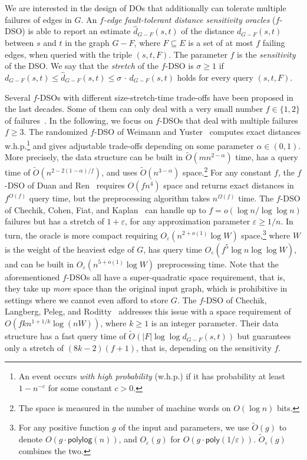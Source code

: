 \documentclass{article}\usepackage[a4paper,margin=20mm]{geometry}
\newcommand*{\Otilde}{\widetilde{O}}
\newcommand*{\poly}{\textsf{poly}}
\newcommand*{\polylog}{\textsf{polylog}}
\renewcommand{\leq}{\leqslant}
\renewcommand{\geq}{\geqslant}
\renewcommand{\ge}{\geqslant}
\newcommand{\eps}{\varepsilon}
\begin{document}
We are interested in the design of DOs that additionally can tolerate multiple failures of edges in $G$. 
An \emph{$f$-edge fault-tolerant distance sensitivity oracles} ($f$-DSO) is able to report an estimate $\widehat{d}_{G-F}(s,t)$ of the distance $d_{G-F}(s,t)$ between $s$ and $t$ in the graph $G-F$, where $F \subseteq E$ is a set of at most $f$ failing edges, when queried with the triple $(s,t,F)$. 
The parameter $f$ is the \emph{sensitivity} of the DSO.
We say that the \emph{stretch} of the $f$-DSO is $\sigma \geq 1$ if $d_{G-F}(s,t) \leq \widehat{d}_{G-F}(s,t) \leq \sigma \,{\cdot}\, d_{G-F}(s,t)$ holds for every query $(s,t,F)$. 

Several $f$-DSOs with different size-stretch-time trade-offs have been proposed in the last decades.
Some of them can only deal with a very small number $f \in \{1,2\}$ of failures~\cite{BaswanaK13, BeKa08, BeKa09, BCFS21SingleSourceDSO_ESA, ChCo20, DemetrescuT02, DeThChRa08, DuanP09a, GrandoniVWilliamsFasterRPandDSO_journal, GuRen21, Ren22Improved}. In the following, we focus on $f$-DSOs that deal with multiple failures $f \geq 3$. The randomized $f$-DSO of Weimann and Yuster~\cite{WY13} computes exact distances w.h.p.\footnote{%
  An event occurs \emph{with high probability} (w.h.p.) if it has probability at least $1- n^{-c}$ for some constant $c >0$.
}
and gives adjustable trade-offs depending on some parameter $\alpha \in (0,1)$.
More precisely, the data structure can be built in $\Otilde(mn^{2-\alpha})$ time, has a query time of 
$\Otilde(n^{2-2(1-\alpha)/f})$, and uses $\Otilde(n^{3-\alpha})$ space.\footnote{%
  The space is measured in the number of machine words on $O(\log n)$ bits.
} 
For any constant $f$, the $f$-DSO of Duan and Ren~\cite{DuRe22} requires $O(fn^4)$ space and
returns exact distances in $f^{O(f)}$ query time, but the preprocessing algorithm 
takes $n^{\Omega(f)}$ time. The $f$-DSO of Chechik, Cohen, Fiat, and Kaplan~\cite{ChCoFiKa17}
can handle up to $f = o(\log n / \log \log n)$ failures
but has a stretch of $1+\eps$, for any approximation parameter $\eps \ge 1/n$.
In turn, the oracle is more compact requiring $O_{\varepsilon}(n^{2+o(1)}\log W)$ space,\footnote{%
	For any positive function $g$ of the input and parameters, we use 
	$\Otilde(g)$ to denote $O(g \cdot \polylog(n))$,
	and $O_{\varepsilon}(g)$ for $O(g \cdot \poly(1/\varepsilon))$.
	$\Otilde_{\varepsilon}(g)$ combines the two.
}
where $W$ is the weight of the heaviest edge of $G$,
has query time $O_{\varepsilon}(f^5\log n \log \log W)$,
and can be built in $O_{\varepsilon}(n^{5+o(1)}\log W)$ preprocessing time.
Note that the aforementioned $f$-DSOs all have a super-quadratic space requirement,
that is, they take up \emph{more} space than the original input graph,
which is prohibitive in settings where we cannot even afford to store $G$.
The $f$-DSO of Chechik, Langberg, Peleg, and Roditty~\cite{CLPR12} addresses this issue
with a space requirement of $O(fkn^{1+1/k}\log(nW))$, 
where $k\geq 1$ is an integer parameter.
Their data structure has a fast query time of $\Otilde(|F| \log\log d_{G-F}(s,t))$
but guarantees only a stretch of $(8k-2)(f+1)$,
that is, depending on the sensitivity $f$.
\end{document}
